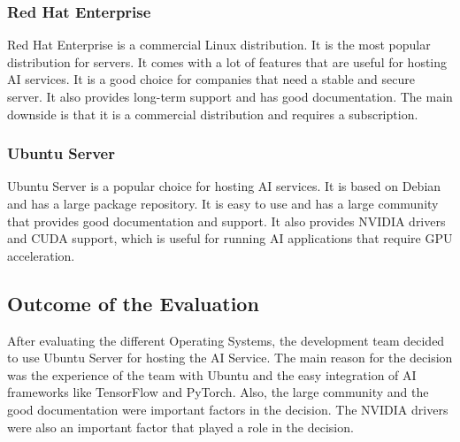 \cite{LinuxForServerDebian}

\subsubsection{Red Hat Enterprise}

Red Hat Enterprise is a commercial Linux distribution. It is the most popular distribution for servers. It comes with a lot of features that are useful for hosting AI services. It is a good choice for companies that need a stable and secure server. It also provides long-term support and has good documentation.
The main downside is that it is a commercial distribution and requires a subscription.

\cite{LinuxForServerRedhat}

\subsubsection{Ubuntu Server}

Ubuntu Server is a popular choice for hosting AI services. It is based on Debian and has a large package repository. It is easy to use and has a large community that provides good documentation and support. It also provides NVIDIA drivers and CUDA support, which is useful for running AI applications that require GPU acceleration.

\cite{LinuxForServerUbuntu} 

\subsection {Outcome of the Evaluation}

After evaluating the different Operating Systems, the development team decided to use Ubuntu Server for hosting the AI Service.
The main reason for the decision was the experience of the team with Ubuntu and the easy integration of AI frameworks like TensorFlow and PyTorch.
Also, the large community and the good documentation were important factors in the decision. The NVIDIA drivers were also an important factor that played a role in the decision.


\author{Florian Prandstetter}
